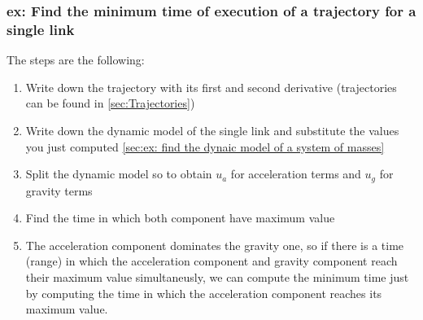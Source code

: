\documentclass[a4paper,12pt]{article}
\begin{document}
\subsubsection{ex: Find the minimum time of execution of a trajectory for a single link}
The steps are the following:
\begin{enumerate}
    \item Write down the trajectory with its first and second derivative (trajectories can be found in \ref{sec:Trajectories})
    \item Write down the dynamic model of the single link and substitute the values 
    you just computed \ref{sec:ex: find the dynaic model of a system of masses}
    \item Split the dynamic model so to obtain $u_a$ for acceleration terms and $u_g$ for gravity terms
    \item Find the time in which both component have maximum value
    \item The acceleration component dominates the gravity one, so if there 
    is a time (range) in which the acceleration component and gravity component
    reach their maximum value simultaneusly, we can compute the minimum time just by 
    computing the time in which the acceleration component reaches its maximum value. 
\end{enumerate}
\end{document}
